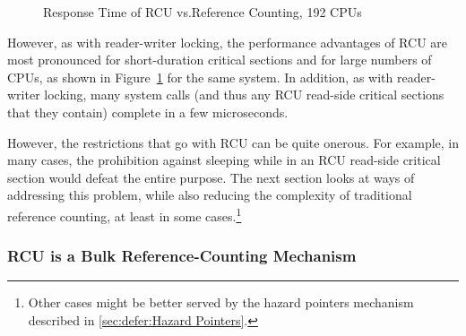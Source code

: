 \begin{figure}[tb]
\centering
{}
\caption{Response Time of RCU vs.\@ Reference Counting, 192 CPUs}
\label{fig:defer:Response Time of RCU vs. Reference Counting}
\end{figure}

However, as with reader-writer locking, the performance advantages of
RCU are most pronounced for short-duration critical sections and for
large numbers of CPUs, as shown in
Figure~\ref{fig:defer:Response Time of RCU vs. Reference Counting}
for the same system.
In addition, as with reader-writer locking, many system calls (and thus
any RCU read-side critical sections that they contain) complete in
a few microseconds.

However, the restrictions that go with RCU can be quite onerous.
For example, in many cases, the prohibition against sleeping while in an RCU
read-side critical section would defeat the entire purpose.
The next section looks at ways of addressing this problem, while also
reducing the complexity of traditional reference counting, at least in
some cases.\footnote{
	Other cases might be better served by the hazard pointers
	mechanism described in \cref{sec:defer:Hazard Pointers}.}

\subsubsection{RCU is a Bulk Reference-Counting Mechanism}
\label{sec:defer:RCU is a Bulk Reference-Counting Mechanism}


